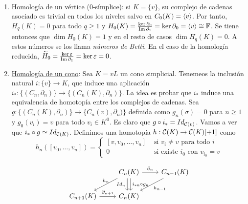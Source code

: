 \documentclass[HS.tex]{subfiles}
\begin{document}
\begin{nota}\
\begin{enumerate}
\item \underline{Homología de un vértice (0-símplice)}: si $K=\{v\}$, su complejo de cadenas asociado es trivial en todos los niveles salvo en $C_0(K)=\langle{v}\rangle$. Por tanto, $H_q(K)=0$ para todo $q\geq 1$ y $H_0(K)=\frac{\ker\partial_0}{\operatorname{Im}\partial_1}=\ker\partial_0=\langle{v}\rangle\cong\mathbb{F}$. Se tiene entonces que $\dim H_0(K)=1$ y en el resto de casos $\dim H_q(K)=0$. A estos números se los llama \emph{números de Betti}. En el caso de la homología reducida, $\widetilde{H}_0=\frac{\ker\varepsilon}{\operatorname{Im}\partial_1}=\ker\varepsilon=0$. 

\item \underline{Homología de un cono}: Sea $K=vL$ un cono simplicial. Tenemeos la inclusión natural $i:\{v\}\to K$, que induce una aplicación $i_*: \{(C_n,\partial_n)\}\to \{(C_n(K),\partial_n)\}$. La idea es probar que $i_*$ induce una equivalencia de homotopía entre los complejos de cadenas. Sea $g:\{(C_n(K),\partial_n)\}\to \{C_n(v),\partial_n)\}$ definida como $g_n(\sigma)=0$ para $n\geq 1$ y $g_0(v_i)=v$ para todo $v_i\in K^0$. Es claro que $g\circ i_*=Id_{\mathcal{C}(v)}$. Vamos a ver que $i_*\circ g\simeq Id_{\mathcal{C}(K)}$. Definimos una homotopía $h: \mathcal{C}(K)\to\mathcal{C}(K)[+1]$ como 
\[
h_n ([v_0,\dots,v_n]) = \begin{cases}
	[v, v_0,\dots,v_n] & \text{ si }v_i \neq v\text{ para todo }i\\
	0 & \text{ si existe }i_0\text{ con }v_{i_0} = v
\end{cases}
\]

\[
\begin{tikzcd}
& C_n(K)\arrow[r, "\partial_n"]\arrow[ld, "h_n" above]\arrow[d, shift left, "Id_n" left=5pt]\arrow[d, shift right, "i_{*n} \circ g_n" right=5pt] & C_{n-1}(K)\arrow[ld, "h_{n-1}"]\\
C_{n+1}(K)\arrow[r, "\partial_{n+1}"] & C_n(K)
\end{tikzcd}
\]


\end{enumerate}
\end{nota}
\end{document}
